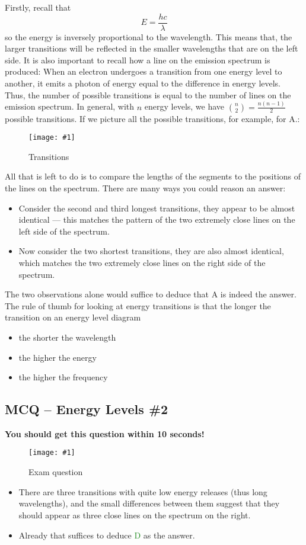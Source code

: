 \documentclass[a4paper,12pt]{article}
\newcommand{\lb}{\\[8pt]}
\newcommand{\img}[4]{\begin{center}
  \begin{figure}[H]
    \centering
    \texttt{[image: \#1]}
    \caption{#3}
    \label{fig:#4}
  \end{figure}
\end{center}}
\begin{document}
Firstly, recall that
$$E = \frac{hc}{\lambda}$$
so the energy is inversely proportional to the wavelength. This means that, the larger transitions will be reflected in the smaller wavelengths that are on the left side.
It is also important to recall how a line on the emission spectrum is produced: When an electron undergoes a transition from one energy level to another, it emits a photon of energy equal to the difference in energy levels. Thus, the number of possible transitions is equal to the number of lines on the emission spectrum. In general, with $n$ energy levels, we have ${n\choose 2} = \frac{n(n-1)}{2}$ possible transitions. If we picture all the possible transitions, for example, for A.:
\img{ex/2.png}{0.2}{Transitions}{ex2}
All that is left to do is to compare the lengths of the segments to the positions of the lines on the spectrum. There are many ways you could reason an answer:
\begin{itemize}
  \item Consider the second and third longest transitions, they appear to be almost identical --- this matches the pattern of the two extremely close lines on the left side of the spectrum.
  \item Now consider the two shortest transitions, they are also almost identical, which matches the two extremely close lines on the right side of the spectrum.
\end{itemize}
The two observations alone would suffice to deduce that A is indeed the answer.\lb
The rule of thumb for looking at energy transitions is that the longer the transition on an energy level diagram
\begin{itemize}
  \item the shorter the wavelength
  \item the higher the energy
  \item the higher the frequency
\end{itemize}

\pagebreak

\subsection{MCQ -- Energy Levels \#2}

\textbf{You should get this question within 10 seconds!}
\img{ex/3.png}{0.8}{Exam question}{ex3}

\begin{itemize}
  \item There are three transitions with quite low energy releases (thus long wavelengths), and the small differences between them suggest that they should appear as three close lines on the spectrum on the right.
  \item Already that suffices to deduce \textcolor{ForestGreen}{D} as the answer.
\end{itemize}
\end{document}
